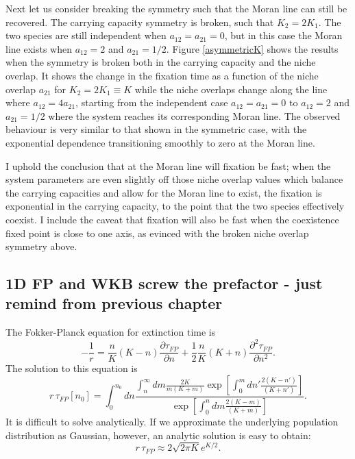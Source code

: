Next let us consider breaking the symmetry such that the Moran line can still be recovered.
The carrying capacity symmetry is broken, such that $K_2 = 2 K_1$.
The two species are still independent when $a_{12}=a_{21}=0$, but in this case the Moran line exists when $a_{12} = 2$ and $a_{21} = 1/2$.
Figure \ref{asymmetricK} shows the results when the symmetry is broken both in the carrying capacity and the niche overlap.
It shows the change in the fixation time as a function of the niche overlap $a_{21}$ for $K_2=2K_1\equiv K$ while the niche overlaps change along the line where $a_{12}=4 a_{21}$, starting from the independent case $a_{12}=a_{21}=0$ to $a_{12} = 2$ and $a_{21} = 1/2$ where the system reaches its corresponding Moran line.
The observed behaviour is very similar to that shown in the symmetric case, with the exponential dependence transitioning smoothly to zero at the Moran line.

I uphold the conclusion that at the Moran line will fixation be fast; when the system parameters are even slightly off those niche overlap values which balance the carrying capacities and allow for the Moran line to exist, the fixation is exponential in the carrying capacity, to the point that the two species effectively coexist. 
I include the caveat that fixation will also be fast when the coexistence fixed point is close to one axis, as evinced with the broken niche overlap symmetry above. 


\iffalse
\subsection{1D FP and WKB screw the prefactor - just remind from previous chapter}
The Fokker-Planck equation for extinction time is \cite{Nisbet1982}
\begin{equation}
-\frac{1}{r} = \frac{n}{K}(K-n)\frac{\partial\tau_{FP}}{\partial n}+\frac{1}{2}\frac{n}{K}(K+n)\frac{\partial^2\tau_{FP}}{\partial n^2}.  
\end{equation}
The solution to this equation is
\begin{equation} \label{fpe-etime}
r\,\tau_{FP}[n_0] = \int^{n_0}_0 dn\frac{\int_n^\infty dm\frac{2K}{m(K+m)}\exp[\int^m_0dn'\frac{2(K-n')}{(K+n')}]}{\exp[\int^n_0dm\frac{2(K-m)}{(K+m)}]}.  
\end{equation}
It is difficult to solve analytically. 
If we approximate the underlying population distribution as Gaussian, however, an analytic solution is easy to obtain:
\begin{equation}
r\,\tau_{FP} \approx 2\sqrt{2\pi K}e^{K/2}. 
\end{equation}

